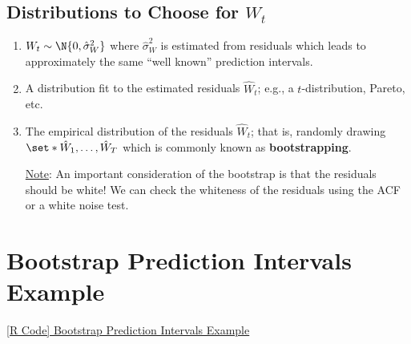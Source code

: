 \subsection*{Distributions to Choose for $ W_t $}
\begin{enumerate}[(1)]
    \item $ W_t \sim \N{0,\hat{\sigma}_W^2} $ where $ \hat{\sigma}_W^2 $ is estimated from residuals which
          leads to approximately the same ``well known'' prediction intervals.
    \item A distribution fit to the estimated residuals $ \hat{W}_t $; e.g., a $ t $-distribution,
          Pareto, etc.
    \item The empirical distribution of the residuals $ \hat{W}_t $; that is,
          randomly drawing $ \set*{\hat{W}_1,\ldots,\hat{W}_{T}} $ which is commonly known
          as \textbf{bootstrapping}.

          \underline{Note}: An important consideration of the bootstrap is that the residuals should be white!
          We can check the whiteness of the residuals using the ACF or a white noise test.
\end{enumerate}
\section{Bootstrap Prediction Intervals Example}
\href{https://github.com/Hextical/university-notes/blob/master/year-3/semester-2/STAT 443/code/6.6 - Bootstrap Prediction Intervals Example.R}{[R Code] Bootstrap Prediction Intervals Example}
